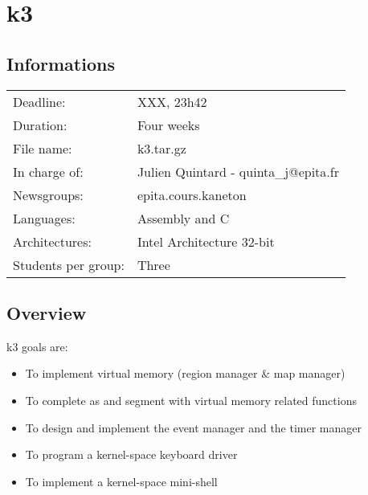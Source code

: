 
%
%

\section{k3}

%
%

\subsection{Informations}

\begin{tabular}{p{7cm}l}
Deadline: & XXX, 23h42 \\
Duration: & Four weeks \\
File name: & k3.tar.gz \\
In charge of: & Julien Quintard - \small{quinta\_j@epita.fr} \\
Newsgroups: & epita.cours.kaneton \\
Languages: & Assembly and C \\
Architectures: & Intel Architecture 32-bit \\
Students per group: & Three \\
\end{tabular}

%
%

\subsection{Overview}

k3 goals are:

\begin{itemize}

\item To implement virtual memory (region manager \& map manager)

\item To complete as and segment with virtual memory related functions

\item To design and implement the event manager and the timer manager

\item To program a kernel-space keyboard driver

\item To implement a kernel-space mini-shell

\end{itemize}

